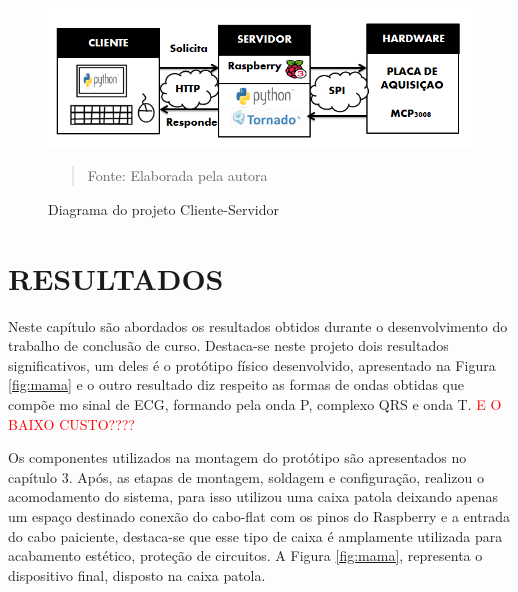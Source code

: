 \documentclass[12pt, a4paper]{article}
\begin{document}
 
 \begin{figure}[H]
\begin{center}
			\caption{Diagrama do projeto Cliente-Servidor}
			\includegraphics[width=1\textwidth]{blocos.PNG}
              \vspace*{\fill} 
            \begin{quote} 
            \centering 
           Fonte: {Elaborada pela autora} 
            \end{quote}
            \vspace*{\fill}
			\label{fig:lopioupe}
            \vspace*{\fill}
			\label{fig:kenny}
\end{center}
\end{figure}
 
\newpage

\section{RESULTADOS}

\hspace*{0.8cm} Neste capítulo são abordados os resultados obtidos durante o desenvolvimento do trabalho de conclusão de curso. Destaca-se neste projeto dois resultados significativos, um deles é o protótipo físico desenvolvido, apresentado na Figura \ref{fig:mama} e o outro resultado diz respeito as formas de ondas obtidas que compõe mo sinal de ECG, formando pela onda P, complexo QRS e onda T. \textcolor{red}{E O BAIXO CUSTO????}

Os componentes utilizados na montagem do protótipo são apresentados no capítulo 3. Após, as etapas de montagem, soldagem e configuração, realizou o acomodamento do sistema, para isso utilizou uma caixa patola deixando apenas um espaço destinado conexão do cabo-flat com os pinos do Raspberry e a entrada do cabo paiciente, destaca-se que esse tipo de caixa é amplamente utilizada para acabamento estético, proteção de circuitos. A Figura \ref{fig:mama}, representa o dispositivo final, disposto na caixa patola.
\end{document}
